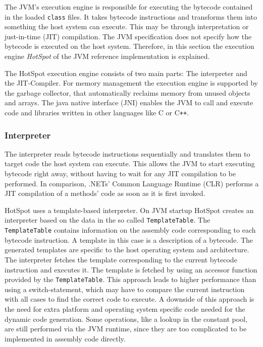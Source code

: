The JVM's execution engine is responsible for executing the bytecode contained in the loaded \texttt{class} files. It takes bytecode instructions and transforms them into something the host system can execute. This may be through interpretation or just-in-time (JIT) compilation. The JVM specification does not specify how the bytecode is executed on the host system. Therefore, in this section the execution engine \textit{HotSpot} of the JVM reference implementation \textcite{OpenJDKHotspotRuntime} is explained.

The HotSpot execution engine consists of two main parts: The interpreter and the JIT-Compiler. For memory management the execution engine is supported by the garbage collector, that automatically reclaims memory from unused objects and arrays. The java native interface (JNI) enables the JVM to call and execute code and libraries written in other languages like C or C\verb|++|.

\subsubsection{Interpreter}

The interpreter reads bytecode instructions sequentially and translates them to target code the host system can execute. This allows the JVM to start executing bytecode right away, without having to wait for any JIT compilation to be performed. In comparison, .NETs' Common Language Runtime (CLR) performs a JIT compilation of a methods' code as soon as it is first invoked\parencite{MicrosoftCILToNative}. 

HotSpot uses a template-based interpreter. On JVM startup HotSpot creates an interpreter based on the data in the so called \texttt{TemplateTable}. The \texttt{TemplateTable} contains information on the assembly code corresponding to each bytecode instruction. A template in this case is a description of a bytecode. The generated templates are specific to the host operating system and architecture. The interpreter fetches the template corresponding to the current bytecode instruction and executes it. The template is fetched by using an accessor function provided by the \texttt{TemplateTable}. This approach leads to higher performance than using a switch-statement, which may have to compare the current instruction with all cases to find the correct code to execute. A downside of this approach is the need for extra platform and operating system specific code needed for the dynamic code generation. Some operations, like a lookup in the constant pool, are still performed via the JVM runtime, since they are too complicated to be implemented in assembly code directly. 

